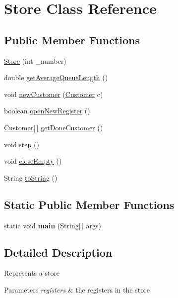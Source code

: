 \hypertarget{class_store}{}\section{Store Class Reference}
\label{class_store}
\subsection*{Public Member Functions}
\begin{DoxyCompactItemize}
\item 
\hyperlink{class_store_ab43dba1d5298e700fd43f38d31636e2e}{Store} (int \+\_\+number)
\item 
double \hyperlink{class_store_aec5aabb20f10795fff9006eb9b638638}{get\+Average\+Queue\+Length} ()
\item 
void \hyperlink{class_store_a580ef39f7aee7c803d3898a276601e2a}{new\+Customer} (\hyperlink{class_customer}{Customer} c)
\item 
boolean \hyperlink{class_store_aacce2e538e5d09e97ac3f3a35b16f1df}{open\+New\+Register} ()
\item 
\hyperlink{class_customer}{Customer}\mbox{[}$\,$\mbox{]} \hyperlink{class_store_a66a370aa1836cfa5be1046c85efa54b2}{get\+Done\+Customer} ()
\item 
void \hyperlink{class_store_a1e6fc97b6ed42be3a794347fdcf5cec6}{step} ()
\item 
void \hyperlink{class_store_a42178a61e6edbfa56b99da40ecc6ee41}{close\+Empty} ()
\item 
String \hyperlink{class_store_a5c6d8363f12a1493a27b4c5ea65aeba5}{to\+String} ()
\end{DoxyCompactItemize}
\subsection*{Static Public Member Functions}
\begin{DoxyCompactItemize}
\item 
\hypertarget{class_store_ab88472a7fda9cfa427027aa7001189b9}{}static void {\bfseries main} (String\mbox{[}$\,$\mbox{]} args)\label{class_store_ab88472a7fda9cfa427027aa7001189b9}

\end{DoxyCompactItemize}


\subsection{Detailed Description}
Represents a store 
\begin{DoxyParams}{Parameters}
{\em registers} & the registers in the store \\
\hline
\end{DoxyParams}


